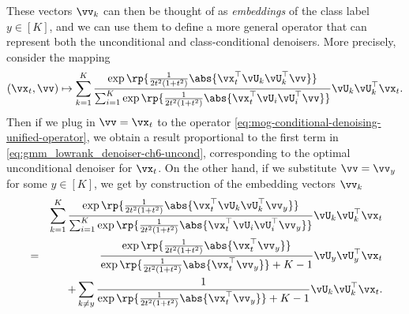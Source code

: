 \documentclass[../../book-main.tex]{subfiles}
\begin{document}
\begin{example}
    These vectors $\vv_k$ can then be thought of as \textit{embeddings} of the
    class label $y \in [K]$, and we can use them to define a more
    general operator
    that can represent both the unconditional and class-conditional denoisers.
    More precisely, consider the mapping
    \begin{equation}\label{eq:mog-conditional-denoising-unified-operator}
        (\vx_t, \vv) \mapsto
        \sum_{k = 1}^{K}\frac{
            \exp\rp{\frac{1}{2t^{2}(1
            + t^{2})} \abs{\vx_t^\top \vU_k \vU_k^\top \vv}}
        }
        {
            \sum_{i
            = 1}^{K}\exp\rp{\frac{1}{2t^{2}(1
            + t^{2})}\abs{\vx_t^\top \vU_i \vU_i^\top \vv}}
        }
        \vU_{k}\vU_{k}^{\top}\vx_t.
    \end{equation}
    Then if we plug in $\vv = \vx_t$ to the operator
    \eqref{eq:mog-conditional-denoising-unified-operator}, we obtain a result
    proportional to the first term in
    \eqref{eq:gmm_lowrank_denoiser-ch6-uncond}, corresponding to the
    optimal unconditional denoiser for $\vx_t$.
    On the other hand,
    if we substitute $\vv = \vv_y$ for some $y \in [K]$, we get
    by construction of the embedding vectors $\vv_k$
    \begin{eqnarray}
        &&\sum_{k = 1}^{K}
        \frac{
            \exp\rp{\frac{1}{2t^{2}(1
            + t^{2})}\abs{\vx_t^\top \vU_k \vU_k^\top \vv_y}}
        }
        {
            \sum_{i
            = 1}^{K}\exp\rp{\frac{1}{2t^{2}(1
            + t^{2})}\abs{\vx_t^\top \vU_i \vU_i^\top \vv_y}}
        }
        \vU_{k}\vU_{k}^{\top}\vx_t \nonumber \\
        &=&
        \frac{
            \exp\rp{\frac{1}{2t^{2}(1
            + t^{2})}\abs{\vx_t^\top \vv_y}}
        }
        {
            \exp\rp{\frac{1}{2t^{2}(1
            + t^{2})}\abs{\vx_t^\top \vv_y}}
            + K-1
        }
        \vU_{y}\vU_{y}^{\top}\vx_t
        \\
        && +
        \sum_{k \neq y}
        \frac{
            1
        }
        {
            \exp\rp{\frac{1}{2t^{2}(1
            + t^{2})}\abs{\vx_t^\top \vv_y}}
            + K-1
        }
        \vU_{k}\vU_{k}^{\top}\vx_t.
    \end{eqnarray}


\end{example}
\end{document}
